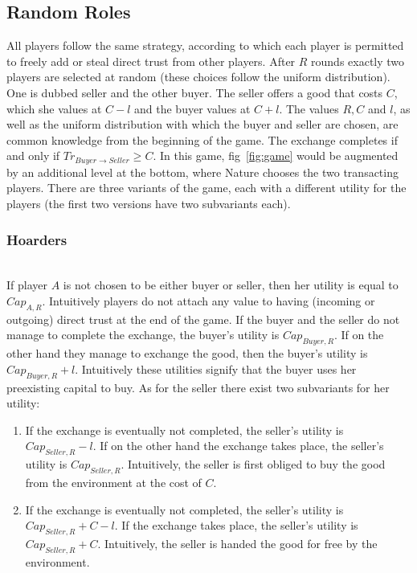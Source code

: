 \subsection{Random Roles}
  All players follow the same strategy, according to which each player is permitted to freely add or steal direct trust from
  other players. After $R$ rounds exactly two players are selected at random (these choices follow the uniform distribution).
  One is dubbed seller and the other buyer. The seller offers a good that costs $C$, which she values at $C - l$ and the buyer
  values at $C + l$. The values $R, C$ and $l$, as well as the uniform distribution with which the buyer and seller are
  chosen, are common knowledge from the beginning of the game. The exchange completes if and only if $Tr_{Buyer \rightarrow
  Seller} \geq C$. In this game, fig~\ref{fig:game} would be augmented by an additional level at the bottom, where Nature
  chooses the two transacting players. There are three variants of the game, each with a different utility for the players
  (the first two versions have two subvariants each).

  \subsubsection{Hoarders} \ \\

    If player $A$ is not chosen to be either buyer or seller, then her utility is equal to $Cap_{A, R}$. Intuitively players
    do not attach any value to having (incoming or outgoing) direct trust at the end of the game. If the buyer and the seller
    do not manage to complete the exchange, the buyer's utility is $Cap_{Buyer, R}$. If on the other hand they manage to
    exchange the good, then the buyer's utility is $Cap_{Buyer, R} + l$. Intuitively these utilities signify that the buyer
    uses her preexisting capital to buy. As for the seller there exist two subvariants for her utility:
    \begin{enumerate}
      \item If the exchange is eventually not completed, the seller's utility is $Cap_{Seller, R} - l$. If on the other hand
      the exchange takes place, the seller's utility is $Cap_{Seller, R}$. Intuitively, the seller is first obliged to buy the
      good from the environment at the cost of $C$.

      \item If the exchange is eventually not completed, the seller's utility is $Cap_{Seller, R} + C - l$. If the exchange
      takes place, the seller's utility is $Cap_{Seller, R} + C$. Intuitively, the seller is handed the good for free by the
      environment.
    \end{enumerate}
    

